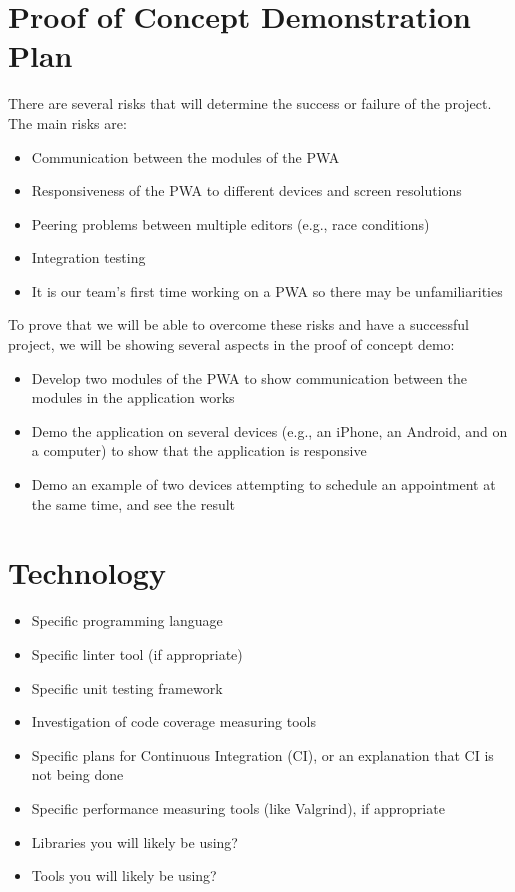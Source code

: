 \documentclass{article}
\begin{document}
\section{Proof of Concept Demonstration Plan}

There are several risks that will determine the success or failure of the project. The main risks are:

\begin{itemize}
	\item Communication between the modules of the PWA
	\item Responsiveness of the PWA to different devices and screen resolutions
	\item Peering problems between multiple editors (e.g., race conditions)
	\item Integration testing
	\item It is our team's first time working on a PWA so there may be unfamiliarities
\end{itemize}

To prove that we will be able to overcome these risks and have a successful project, we will be showing 
several aspects in the proof of concept demo:

\begin{itemize}
	\item Develop two modules of the PWA to show communication between the modules in the application works
	\item Demo the application on several devices (e.g., an iPhone, an Android, and on a computer) to show that the application is responsive
	\item Demo an example of two devices attempting to schedule an appointment at the same time, and see the result
\end{itemize}

\section{Technology}

\begin{itemize}
\item Specific programming language
\item Specific linter tool (if appropriate)
\item Specific unit testing framework
\item Investigation of code coverage measuring tools
\item Specific plans for Continuous Integration (CI), or an explanation that CI
  is not being done
\item Specific performance measuring tools (like Valgrind), if
  appropriate
\item Libraries you will likely be using?
\item Tools you will likely be using?
\end{itemize}
\end{document}
